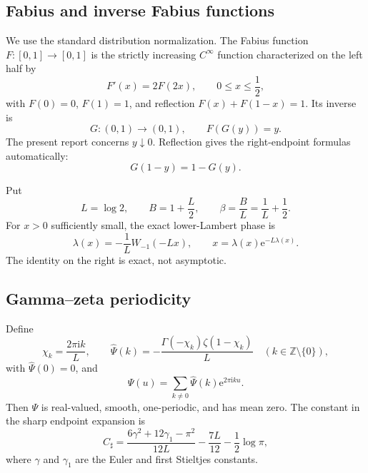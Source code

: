 \documentclass[11pt,oneside]{article}
\numberwithin{equation}{section}
\theoremstyle{definition}
\theoremstyle{remark}
\newcommand{\Z}{\mathbb Z}
\newcommand{\e}{\mathrm e}
\newcommand{\ii}{\mathrm i}
\newcommand{\Psihat}{\widehat\Psi}
\newcommand{\Csharp}{C_{\sharp}}
\begin{document}
\subsection{Fabius and inverse Fabius functions}
We use the standard distribution normalization.  The Fabius function $F:[0,1]\to[0,1]$ is the strictly increasing $C^\infty$ function characterized on the left half by
\begin{equation}
 F'(x)=2F(2x),\qquad 0\le x\le\frac12,
 \label{eq:fabius-dde}
\end{equation}
with $F(0)=0$, $F(1)=1$, and reflection $F(x)+F(1-x)=1$.  Its inverse is
\begin{equation}
 G:(0,1)\longrightarrow(0,1),\qquad F(G(y))=y.
\end{equation}
The present report concerns $y\downarrow0$.  Reflection gives the right-endpoint formulas automatically:
\begin{equation}
 G(1-y)=1-G(y).
 \label{eq:inverse-reflection}
\end{equation}

Put
\begin{equation}
 L=\log2,\qquad B=1+\frac L2,\qquad
 \beta=\frac BL=\frac1L+\frac12.
 \label{eq:constants-L-beta}
\end{equation}
For $x>0$ sufficiently small, the exact lower-Lambert phase is
\begin{equation}
 \lambda(x)=-\frac1L W_{-1}(-Lx),
 \qquad x=\lambda(x)\e^{-L\lambda(x)}.
 \label{eq:exact-lambert-phase}
\end{equation}
The identity on the right is exact, not asymptotic.

\subsection{Gamma--zeta periodicity}
Define
\begin{equation}
 \chi_k=\frac{2\pi\ii k}{L},\qquad
 \Psihat(k)=-\frac{\Gamma(-\chi_k)\zeta(1-\chi_k)}{L}
 \quad(k\in\Z\setminus\{0\}),
 \label{eq:Psi-hat}
\end{equation}
with $\Psihat(0)=0$, and
\begin{equation}
 \Psi(u)=\sum_{k\ne0}\Psihat(k)\e^{2\pi\ii ku}.
 \label{eq:Psi-Fourier}
\end{equation}
Then $\Psi$ is real-valued, smooth, one-periodic, and has mean zero.  The constant in the sharp endpoint expansion is
\begin{equation}
 \Csharp=
 \frac{6\gamma^2+12\gamma_1-\pi^2}{12L}
 -\frac{7L}{12}-\frac12\log\pi,
 \label{eq:Csharp}
\end{equation}
where $\gamma$ and $\gamma_1$ are the Euler and first Stieltjes constants.
\end{document}
